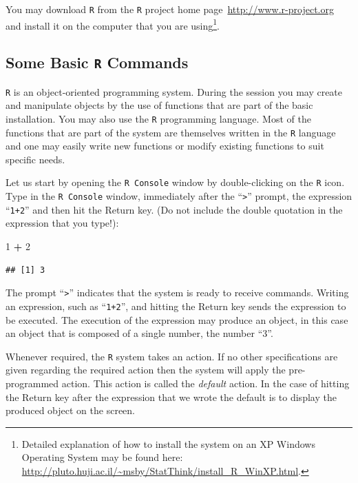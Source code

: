 \documentclass[]{krantz}
\makeatletter
\newenvironment{Shaded}{\begin{snugshade}}{\end{snugshade}}
\newcommand{\DecValTok}[1]{\textcolor[rgb]{0.00,0.00,0.81}{#1}}
\newcommand{\OperatorTok}[1]{\textcolor[rgb]{0.81,0.36,0.00}{\textbf{#1}}}
\newcommand{\StringTok}[1]{\textcolor[rgb]{0.31,0.60,0.02}{#1}}
\newenvironment{kframe}{%
\medskip{}
\setlength{\fboxsep}{.8em}
 \def\at@end@of@kframe{}%
 \ifinner\ifhmode%
  \def\at@end@of@kframe{\end{minipage}}%
  \begin{minipage}{\columnwidth}%
 \fi\fi%
 \def\FrameCommand##1{\hskip\@totalleftmargin \hskip-\fboxsep
 \colorbox{shadecolor}{##1}\hskip-\fboxsep
     \hskip-\linewidth \hskip-\@totalleftmargin \hskip\columnwidth}%
 \MakeFramed {\advance\hsize-\width
   \@totalleftmargin\z@ \linewidth\hsize
   \@setminipage}}%
 {\par\unskip\endMakeFramed%
 \at@end@of@kframe}
\renewenvironment{Shaded}{\begin{kframe}}{\end{kframe}}
\theoremstyle{definition}
\theoremstyle{definition}
\theoremstyle{definition}
\theoremstyle{remark}
\makeatother
\begin{document}
You may download \texttt{R} from the \texttt{R} project home
page~\url{http://www.r-project.org} and install it on the computer that you
are using\footnote{Detailed explanation of how to install the system on an XP Windows
  Operating System may be found here:
  \url{http://pluto.huji.ac.il/~msby/StatThink/install_R_WinXP.html}.}.

\hypertarget{some-basic-r-commands}{%
\subsection{\texorpdfstring{Some Basic \texttt{R} Commands}{Some Basic R Commands}}\label{some-basic-r-commands}}

\texttt{R} is an object-oriented programming system. During the session you may
create and manipulate objects by the use of functions that are part of
the basic installation. You may also use the \texttt{R} programming language.
Most of the functions that are part of the system are themselves written
in the \texttt{R} language and one may easily write new functions or modify
existing functions to suit specific needs.

Let us start by opening the \texttt{R\ Console} window by double-clicking on the
\texttt{R} icon. Type in the \texttt{R\ Console} window, immediately after the ``\texttt{\textgreater{}}''
prompt, the expression ``\texttt{1+2}'' and then hit the Return key. (Do not
include the double quotation in the expression that you type!):

\begin{Shaded}
\begin{Highlighting}[]
\DecValTok{1} \OperatorTok{+}\StringTok{ }\DecValTok{2}
\end{Highlighting}
\end{Shaded}

\begin{verbatim}
## [1] 3
\end{verbatim}

The prompt ``\texttt{\textgreater{}}'' indicates that the system is ready to receive commands.
Writing an expression, such as ``\texttt{1+2}'', and hitting the Return key sends
the expression to be executed. The execution of the expression may
produce an object, in this case an object that is composed of a single
number, the number ``3''.

Whenever required, the \texttt{R} system takes an action. If no other
specifications are given regarding the required action then the system
will apply the pre-programmed action. This action is called the
\emph{default} action. In the case of hitting the Return key after the
expression that we wrote the default is to display the produced object
on the screen.
\end{document}
